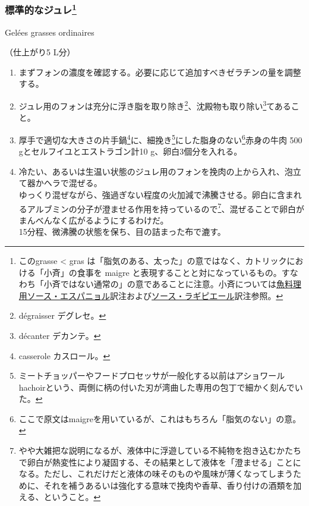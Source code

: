 \begin{recette}

\hypertarget{gelees-ordinaires}{%
\subsubsection[標準的なジュレ]{\texorpdfstring{標準的なジュレ\footnote{このgrasse
  \textless{} gras
  は「脂気のある、太った」の意ではなく、カトリックにおける「小斉」の食事を
  maigre
  と表現することと対になっているもの。すなわち「小斉ではない通常の」の意であることに注意。小斉については\protect\hyperlink{sauce-espagnole-maigre}{魚料理用ソース・エスパニョル}訳注および\protect\hyperlink{sauce-laguipiere}{ソース・ラギピエール}訳注参照。}}{標準的なジュレ}}\label{gelees-ordinaires}}

\begin{frsubenv}

Gelées grasses ordinaires

\end{frsubenv}


（仕上がり5 L分）

\begin{enumerate}
\def\labelenumi{\arabic{enumi}.}
\item
  まずフォンの濃度を確認する。必要に応じて追加すべきゼラチンの量を調整する。
\item
  ジュレ用のフォンは充分に浮き脂を取り除き\footnote{dégraisser
    デグレセ。}、沈殿物も取り除い\footnote{décanter デカンテ。}てあること。
\item
  厚手で適切な大きさの片手鍋\footnote{casserole カスロール。}に、細挽き\footnote{ミートチョッパーやフードプロセッサが一般化する以前はアショワールhachoirという、両側に柄の付いた刃が湾曲した専用の包丁で細かく刻んでいた。}にした脂身のない\footnote{ここで原文はmaigreを用いているが、これはもちろん「脂気のない」の意。}赤身の牛肉
  500 gとセルフイユとエストラゴン計10 g、卵白3個分を入れる。
\item
  冷たい、あるいは生温い状態のジュレ用のフォンを挽肉の上から入れ、泡立て器かヘラで混ぜる。\\
  ゆっくり混ぜながら、強過ぎない程度の火加減で沸騰させる。卵白に含まれるアルブミンの分子が澄ませる作用を持っているので\footnote{やや大雑把な説明になるが、液体中に浮遊している不純物を抱き込むかたちで卵白が熱変性により凝固する、その結果として液体を「澄ませる」ことになる。ただし、これだけだと液体の味そのものや風味が薄くなってしまうために、それを補うあるいは強化する意味で挽肉や香草、香り付けの酒類を加える、ということ。}、混ぜることで卵白がまんべんなく広がるようにするわけだ。\\
  15分程、微沸騰の状態を保ち、目の詰まった布で漉す。
\end{enumerate}


\end{recette}
